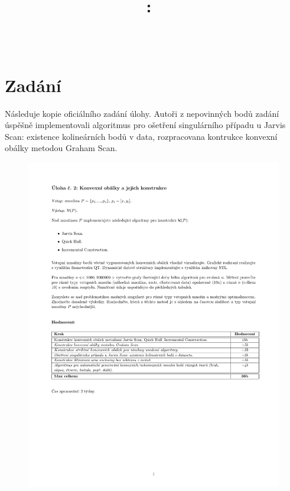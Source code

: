\documentclass{article}
\title{
\vspace{2in}
\textmd{\textbf{\hmwkClass:\ \hmwkTitle}}\\
\normalsize\vspace{0.1in}\large{\hmwkDueDate}\\
\vspace{3in}
}
\author{\textbf{\hmwkAuthorName}}
\date{} %
\begin{document}
\maketitle



\newpage
\tableofcontents
\newpage



\section{Zadání}
\indent Následuje kopie oficiálního zadání úlohy. Autoři z nepovinných bodů zadání úspěšně implementovali algoritmus pro ošetření singulárního případu u Jarvis Scan: existence kolineárních bodů v data, rozpracovana kontrukce konvexní obálky metodou Graham Scan.
\begin{figure}[htbp]
    \centering
        \includegraphics[clip, trim=0cm 7cm 0cm 0cm, width=1.00\textwidth]{zadani.pdf}
\end{figure}
\clearpage
\end{document}
